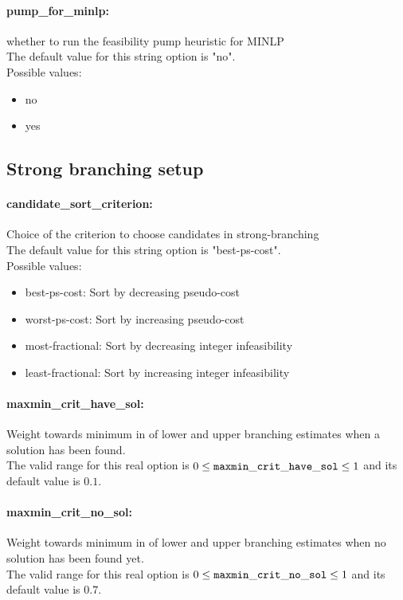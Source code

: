 \paragraph{pump\_for\_minlp:}\label{opt:pump_for_minlp} whether to run the feasibility pump heuristic for MINLP \\
 The default value for this string option is "no".
\\ 
Possible values:
\begin{itemize}
   \item no
   \item yes
\end{itemize}

\subsection{Strong branching setup}
\label{sec:Strongbranchingsetup}
\paragraph{candidate\_sort\_criterion:}\label{opt:candidate_sort_criterion} Choice of the criterion to choose candidates in strong-branching \\
 The default value for this string option is "best-ps-cost".
\\ 
Possible values:
\begin{itemize}
   \item best-ps-cost: Sort by decreasing pseudo-cost
   \item worst-ps-cost: Sort by increasing pseudo-cost
   \item most-fractional: Sort by decreasing integer infeasibility
   \item least-fractional: Sort by increasing integer infeasibility
\end{itemize}

\paragraph{maxmin\_crit\_have\_sol:}\label{opt:maxmin_crit_have_sol} Weight towards minimum in of lower and upper branching estimates when a solution has been found. \\
 The valid range for this real option is 
$0 \le {\tt maxmin\_crit\_have\_sol } \le 1$
and its default value is $0.1$.


\paragraph{maxmin\_crit\_no\_sol:}\label{opt:maxmin_crit_no_sol} Weight towards minimum in of lower and upper branching estimates when no solution has been found yet. \\
 The valid range for this real option is 
$0 \le {\tt maxmin\_crit\_no\_sol } \le 1$
and its default value is $0.7$.


